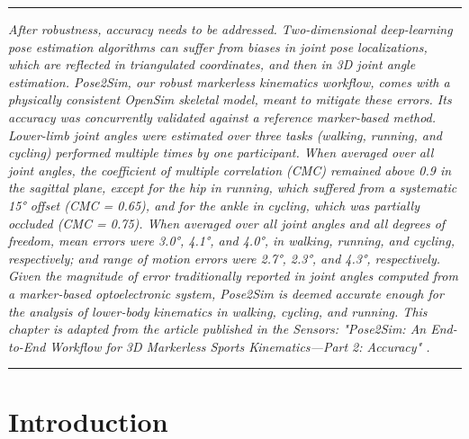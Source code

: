 \begin{center}
\rule{0.7\linewidth}{.5pt}
\begin{minipage}{0.7\linewidth}
\smallskip

\textit{After robustness, accuracy needs to be addressed. Two-dimensional deep-learning pose estimation algorithms can suffer from biases in joint pose localizations, which are reflected in triangulated coordinates, and then in 3D joint angle estimation. Pose2Sim, our robust markerless kinematics workflow, comes with a physically consistent OpenSim skeletal model, meant to mitigate these errors. \newline\newline
Its accuracy was concurrently validated against a reference marker-based method. Lower-limb joint angles were estimated over three tasks (walking, running, and cycling) performed multiple times by one participant. When averaged over all joint angles, the coefficient of multiple correlation (CMC) remained above 0.9 in the sagittal plane, except for the hip in running, which suffered from a systematic 15° offset (CMC = 0.65), and for the ankle in cycling, which was partially occluded (CMC = 0.75). When averaged over all joint angles and all degrees of freedom, mean errors were 3.0°, 4.1°, and 4.0°, in walking, running, and cycling, respectively; and range of motion errors were 2.7°, 2.3°, and 4.3°, respectively. Given the magnitude of error traditionally reported in joint angles computed from a marker-based optoelectronic system, Pose2Sim is deemed accurate enough for the analysis of lower-body kinematics in walking, cycling, and running. \newline\newline
This chapter is adapted from the article published in the Sensors: "Pose2Sim: An End-to-End Workflow for 3D Markerless Sports Kinematics—Part 2: Accuracy" \cite{Pagnon2022a}.
}

\end{minipage}
\smallskip
\rule{0.7\linewidth}{.5pt}
\end{center}

\pagebreak
\minitoc
\newpage


\section{Introduction}

